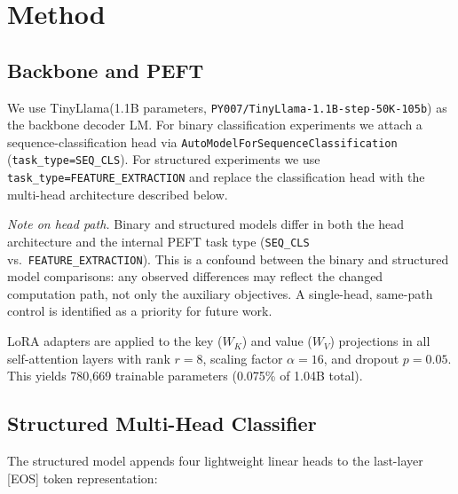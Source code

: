 \documentclass{article}
\newcommand{\tl}{TinyLlama\xspace}
\begin{document}
\section{Method}
\label{sec:method}

\subsection{Backbone and PEFT}
We use \tl (1.1B parameters, \texttt{PY007/TinyLlama-1.1B-step-50K-105b}) as
the backbone decoder LM.
For binary classification experiments we attach a sequence-classification
head via \texttt{AutoModelForSequenceClassification}
(\texttt{task\_type=SEQ\_CLS}).
For structured experiments we use \texttt{task\_type=FEATURE\_EXTRACTION} and
replace the classification head with the multi-head architecture described below.

\emph{Note on head path.}
Binary and structured models differ in both the head architecture and the
internal PEFT task type (\texttt{SEQ\_CLS} vs.\ \texttt{FEATURE\_EXTRACTION}).
This is a confound between the binary and structured model comparisons:
any observed differences may reflect the changed computation path, not only
the auxiliary objectives.
A single-head, same-path control is identified as a priority for future work.

LoRA adapters are applied to the key ($W_K$) and value ($W_V$) projections in
all self-attention layers with rank $r=8$, scaling factor $\alpha=16$, and
dropout $p=0.05$.
This yields 780,669 trainable parameters (0.075\% of 1.04B total).

\subsection{Structured Multi-Head Classifier}
\label{sec:structured}

The structured model appends four lightweight linear heads to the last-layer
[EOS] token representation:
\end{document}
